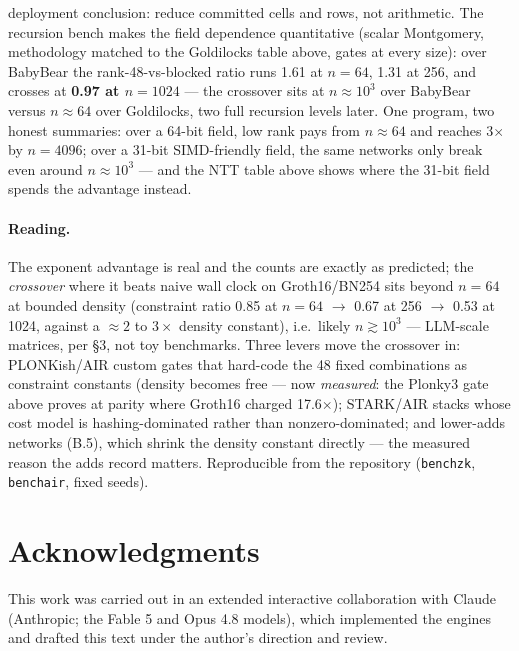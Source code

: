 \documentclass[10pt]{article}
\begin{document}
deployment conclusion: reduce committed cells and rows, not
arithmetic. The recursion bench makes the field dependence
quantitative (scalar
Montgomery, methodology matched to the Goldilocks table above,
gates at every size): over BabyBear the rank-48-vs-blocked ratio
runs 1.61 at $n = 64$, 1.31 at 256, and crosses at \textbf{0.97
at $n = 1024$} --- the crossover sits at $n \approx 10^3$ over
BabyBear versus $n \approx 64$ over Goldilocks, two full recursion
levels later. One program, two honest summaries: over a 64-bit
field, low rank pays from $n \approx 64$ and reaches 3$\times$ by
$n = 4096$; over a 31-bit SIMD-friendly field, the same networks
only break even around $n \approx 10^3$ --- and the NTT table
above shows where the 31-bit field spends the advantage instead.

\paragraph{Reading.} The exponent advantage is real and the counts
are exactly as predicted; the \emph{crossover} where it beats
naive wall clock on Groth16/BN254 sits beyond $n=64$ at bounded
density (constraint ratio 0.85 at $n{=}64$ $\to$ 0.67 at 256
$\to$ 0.53 at 1024, against a ${\approx}2$ to $3\times$ density
constant), i.e.\ likely $n \gtrsim 10^3$ --- LLM-scale matrices,
per \S3, not toy benchmarks. Three levers move the crossover in:
PLONKish/AIR custom gates that hard-code the 48 fixed combinations
as constraint constants (density becomes free --- now
\emph{measured}: the Plonky3 gate above proves at parity where
Groth16 charged 17.6$\times$); STARK/AIR stacks whose cost model
is hashing-dominated rather than nonzero-dominated; and
lower-adds networks (B.5), which shrink the density constant
directly --- the measured reason the adds record matters.
Reproducible from the repository (\texttt{benchzk},
\texttt{benchair}, fixed seeds).

\section*{Acknowledgments}

This work was carried out in an extended interactive collaboration
with Claude (Anthropic; the Fable 5 and Opus 4.8 models), which
implemented the engines and drafted this text under the author's
direction and review.
\end{document}
